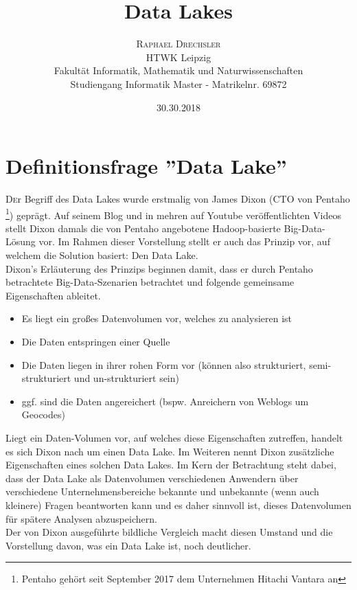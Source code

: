 \documentclass[twoside,twocolumn]{article}
\title{Data Lakes} %
\author{%
\textsc{Raphael Drechsler}\\[1ex] %
\normalsize HTWK Leipzig \\ 
\normalsize Fakultät Informatik, Mathematik und Naturwissenschaften\\ 
\normalsize Studiengang Informatik Master - Matrikelnr. 69872\\%
}
\date{30.30.2018} %
\begin{document}
\maketitle


\section{Definitionsfrage ''Data Lake''}
\lettrine[nindent=0em,lines=2]{D}er Begriff des Data Lakes wurde erstmalig von James Dixon (CTO von Pentaho \footnote{Pentaho gehört seit September 2017 dem Unternehmen Hitachi Vantara an}) geprägt. Auf seinem Blog \cite{src5}  und in mehren auf Youtube veröffentlichten Videos \cite{src6} stellt Dixon damals die von Pentaho angebotene Hadoop-basierte Big-Data-Lösung vor. Im Rahmen dieser Vorstellung stellt er auch das Prinzip vor, auf welchem die Solution basiert: Den Data Lake.\\
Dixon's Erläuterung des Prinzips beginnen damit, dass er durch Pentaho betrachtete Big-Data-Szenarien betrachtet und folgende gemeinsame Eigenschaften ableitet. 
\begin{itemize}
	\item Es liegt ein großes Datenvolumen vor, welches zu analysieren ist
	\item Die Daten entspringen einer Quelle
	\item Die Daten liegen in ihrer rohen Form vor (können also strukturiert, semi-strukturiert und un-strukturiert sein)
	\item ggf. sind die Daten angereichert (bspw. Anreichern von Weblogs um Geocodes)
\end{itemize}

\noindent Liegt ein Daten-Volumen vor, auf welches diese Eigenschaften zutreffen, handelt es sich Dixon nach um einen Data Lake. Im Weiteren nennt Dixon zusätzliche Eigenschaften eines solchen Data Lakes. Im Kern der Betrachtung steht dabei, dass der Data Lake als Datenvolumen verschiedenen Anwendern über verschiedene Unternehmensbereiche bekannte und unbekannte (wenn auch kleinere) Fragen beantworten kann und es daher sinnvoll ist, dieses Datenvolumen für spätere Analysen abzuspeichern.\\
Der von Dixon ausgeführte bildliche Vergleich macht diesen Umstand und die Vorstellung davon, was ein Data Lake ist, noch deutlicher.
\end{document}
